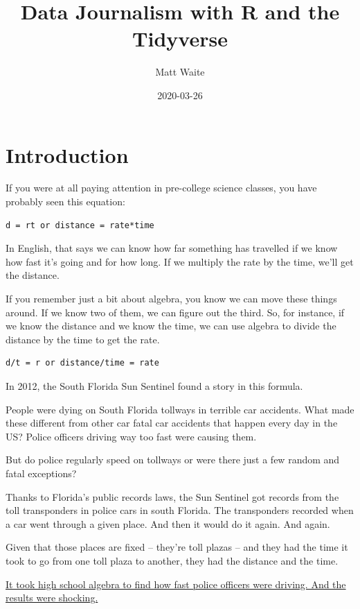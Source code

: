 \documentclass[]{book}
\title{Data Journalism with R and the Tidyverse}
\author{Matt Waite}
\date{2020-03-26}
\begin{document}
\maketitle

{
\setcounter{tocdepth}{1}
\tableofcontents
}
\hypertarget{introduction}{%
\chapter{Introduction}\label{introduction}}

If you were at all paying attention in pre-college science classes, you have probably seen this equation:

\begin{verbatim}
d = rt or distance = rate*time
\end{verbatim}

In English, that says we can know how far something has travelled if we know how fast it's going and for how long. If we multiply the rate by the time, we'll get the distance.

If you remember just a bit about algebra, you know we can move these things around. If we know two of them, we can figure out the third. So, for instance, if we know the distance and we know the time, we can use algebra to divide the distance by the time to get the rate.

\begin{verbatim}
d/t = r or distance/time = rate
\end{verbatim}

In 2012, the South Florida Sun Sentinel found a story in this formula.

People were dying on South Florida tollways in terrible car accidents. What made these different from other car fatal car accidents that happen every day in the US? Police officers driving way too fast were causing them.

But do police regularly speed on tollways or were there just a few random and fatal exceptions?

Thanks to Florida's public records laws, the Sun Sentinel got records from the toll transponders in police cars in south Florida. The transponders recorded when a car went through a given place. And then it would do it again. And again.

Given that those places are fixed -- they're toll plazas -- and they had the time it took to go from one toll plaza to another, they had the distance and the time.

\href{http://www.sun-sentinel.com/news/local/speeding-cops/fl-speeding-cops-20120211,0,3706919.story}{It took high school algebra to find how fast police officers were driving. And the results were shocking.}
\end{document}
